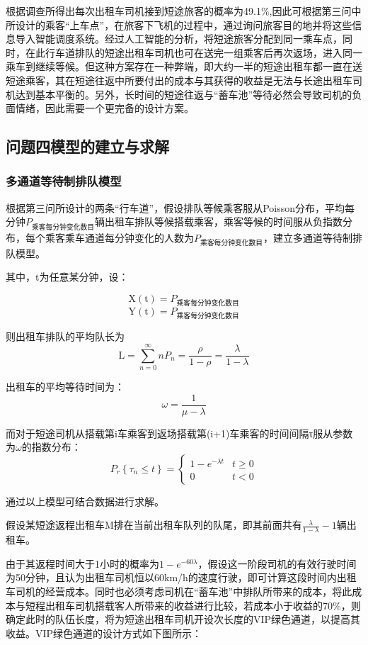 \documentclass[withoutpreface,bwprint]{cumcmthesis} %
\begin{document}
根据调查所得出每次出租车司机接到短途旅客的概率为49.1$\%$,因此可根据第三问中所设计的乘客“上车点”，在旅客下飞机的过程中，通过询问旅客目的地并将这些信息导入智能调度系统。经过人工智能的分析，将短途旅客分配到同一乘车点，同时，在此行车道排队的短途出租车司机也可在送完一组乘客后再次返场，进入同一乘车到继续等候。但这种方案存在一种弊端，即大约一半的短途出租车都一直在送短途乘客，其在短途往返中所要付出的成本与其获得的收益是无法与长途出租车司机达到基本平衡的。另外，长时间的短途往返与“蓄车池”等待必然会导致司机的负面情绪，因此需要一个更完备的设计方案。

\subsection{问题四模型的建立与求解}
\subsubsection{多通道等待制排队模型}
根据第三问所设计的两条“行车道”，假设排队等候乘客服从Poisson分布，平均每分钟$P_{\text{乘客每分钟变化数目}}$辆出租车排队等候搭载乘客，乘客等候的时间服从负指数分布，每个乘客乘车通道每分钟变化的人数为$P_{\text{乘客每分钟变化数目}}$，建立多通道等待制排队模型。

其中，t为任意某分钟，设：

$$
\mathrm{X}(\mathrm{t})=P_{\text{乘客每分钟变化数目}}
$$
$$
\mathrm{Y}(\mathrm{t})=P_{\text{乘客每分钟变化数目}}
$$

则出租车排队的平均队长为
$$
\mathrm{L}=\sum_{n=0}^{\infty} n P_{n}=\frac{\rho}{1-\rho}=\frac{\lambda}{1-\lambda}
$$

出租车的平均等待时间为：
$$
\omega=\frac{1}{\mu-\lambda}
$$

而对于短途司机从搭载第i车乘客到返场搭载第(i+1)车乘客的时间间隔τ服从参数为$\omega$的指数分布：
$$
P_{r}\left\{\tau_{n} \leq t\right\}=\left\{\begin{array}{ll}{1-e^{-\lambda t}} & {t \geq 0} \\ {0} & {t<0}\end{array}\right.
$$

通过以上模型可结合数据进行求解。

假设某短途返程出租车M排在当前出租车队列的队尾，即其前面共有$\frac{\lambda}{1-\lambda}-1$辆出租车。

由于其返程时间大于1小时的概率为$1-e^{-60 \lambda}$，假设这一阶段司机的有效行驶时间为50分钟，且认为出租车司机恒以60km/h的速度行驶，即可计算这段时间内出租车司机的经营成本。同时也必须考虑司机在“蓄车池”中排队所带来的成本，将此成本与短程出租车司机搭载客人所带来的收益进行比较，若成本小于收益的70$\%$，则确定此时的队伍长度，将为短途出租车司机开设次长度的VIP绿色通道，以提高其收益。VIP绿色通道的设计方式如下图所示：
\end{document}
